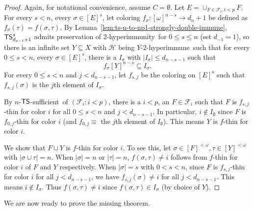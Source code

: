 \documentclass{amsart}
\theoremstyle{definition}
\theoremstyle{remark}
\numberwithin{equation}{section}
\theoremstyle{noparens}
\def\propertyL{2-hyperimmunity}
\def\hyper{2-hyperimmune}
\def\mcal{\mathcal}
\newcommand{\Hcal}{\mathcal{H}}
\newcommand{\s}[1]{\ensuremath{\sf{#1}}}
\DeclareMathOperator{\ts}{\s{TS}}
\def\tssufficient{$\ts$-sufficient}
\begin{document}
\begin{proof}
Again, for notational convenience, assume $C=\emptyset$.
Let $E=\cup_{F\in \mcal{F}_i,i<p}F$.
For every $s<n$, every $\sigma\in [E]^s$,
let coloring $f_\sigma:[\omega]^{n-s}\rightarrow  d_n+1$ be defined as $f_\sigma(\tau) = f(\sigma,\tau)$.
By Lemma~\ref{lem:ts-n-to-np1-strongly-double-immune}, $\ts^s_{d_{s-1}+1}$ admits preservation of \propertyL\ for $0\leq s\leq n$ (set $d_{-1} = 1$), so
there is an infinite set $Y\subseteq X$ with $\Hcal$ being $Y $-\hyper\ such that
for every $0\leq s<n$, every $\sigma\in [E]^s$,
there is a $I_\sigma$ with $|I_\sigma|\leq d_{n -s-1}$
such that $$f_\sigma[Y]^{n-s}\subseteq I_\sigma.$$
For every $0\leq s<n$ and $j< d_{n-s-1}$, let $f_{s,j}$ be the coloring on
$[E]^s$ such that $f_{s,j}(\sigma)  $ is the $j$th element of $I_\sigma$.

By $n$-\tssufficient\ of $(\mcal{F}_i:i<p)$,
there is a $i<p$, an $F\in\mcal{F}_i$ such that
$F$ is $f_{s,j}$-thin for color $i$ for all $0\leq s<n$ and $j<d_{n-s-1}$.
In particular, $i\notin I_\emptyset $ since $F$ is $f_{0,j}$-thin for color $i$
(and $f_{0,j}\equiv$  the $j$th element of $I_\emptyset$).
This means $Y$ is $f$-thin for color $i$.

We show that $F\cup Y$ is $f$-thin for color $i$.
To see this, let $\sigma\in [F]^{<\omega},\tau\in [Y]^{<\omega}$
with $|\sigma\cup \tau| = n$.
When $|\sigma|=n$ or $|\tau| = n$, $ f(\sigma,\tau)\ne i$
follows from $f$-thin for color $i$ of $F$ and $Y$ respectively.
When $|\sigma|=s$ with $0<s<n$, since $F$ is $f_{s,j}$-thin for color $i$ for all $j<d_{n-s-1}$,
we have $f_{s,j}(\sigma)\ne i$ for all $j<d_{n-s-1}$.
This means $i\notin I_\sigma$.
Thus $f(\sigma,\tau)\ne i$ since $f(\sigma,\tau)\in I_\sigma$
(by choice of $Y$).
\end{proof}

We are now ready to prove the missing theorem.
\end{document}
